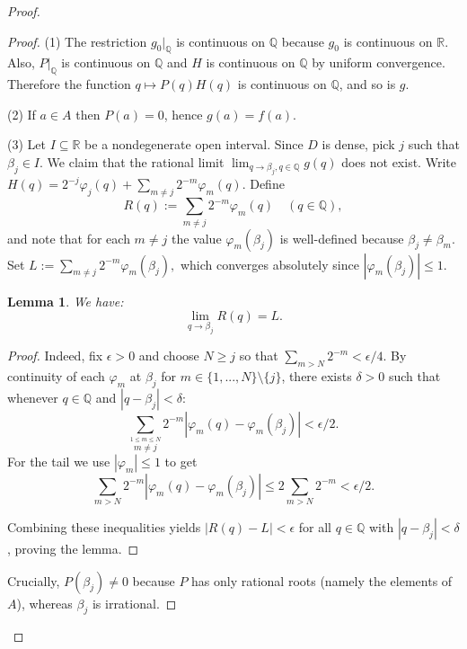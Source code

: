 \documentclass[10pt,a4paper]{amsart}
\newtheorem{lemma}{Lemma}
\begin{document}
\begin{proof}
\begin{proof}
(1) The restriction $g_{0}|_{\mathbb{Q}}$ is continuous on $\mathbb{Q}$ because $g_{0}$ is continuous on $\mathbb{R}$. Also, $P|_{\mathbb{Q}}$ is continuous on $\mathbb{Q}$ and $H$ is continuous on $\mathbb{Q}$ by uniform convergence. Therefore the function $q\mapsto P(q)H(q)$ is continuous on $\mathbb{Q}$, and so is $g$.

(2) If $a\in A$ then $P(a)=0$, hence $g(a)=f(a).$

(3) Let $I\subseteq\mathbb{R}$ be a nondegenerate open interval. Since $D$ is dense, pick $j$ such that $\beta_{j}\in I$. We claim that the rational limit $\lim_{q\rightarrow\beta_{j},q\in\mathbb{Q}}g(q)$ does not exist. Write $H(q)=2^{-j}\varphi_{j}(q)+\sum_{m\ne j}2^{-m}\varphi_{m}(q).$
Define
\begin{equation} 
R(q):=\sum_{m\ne j}2^{-m}\varphi_{m}(q) \quad (q\in\mathbb{Q}), \end{equation}
and note that for each $m\ne j$ the value $\varphi_{m}(\beta_{j})$ is well-defined because $\beta_{j}\ne\beta_{m}$. Set $L:=\sum_{m\ne j}2^{-m}\varphi_{m}(\beta_{j}),$ 
which converges absolutely since $|\varphi_{m}(\beta_{j})|\le1$.
\begin{lemma}  We have:
\begin{equation} 
\lim_{q\rightarrow\beta_{j}}R(q)=L.
\end{equation} 
\end{lemma} 
\begin{proof} 
Indeed, fix $\epsilon>0$ and choose $N\geq j$ so that $\sum_{m>N}2^{-m}<\epsilon/4$. By continuity of each $\varphi_{m}$ at $\beta_{j}$ for $m\in\{1,...,N\}\setminus\{j\}$, there exists $\delta>0$ such that whenever $q\in\mathbb{Q}$ and $|q-\beta_{j}|<\delta$:
\begin{equation} 
\sum_{\stackrel{1\le m\le N}{m\neq j}}2^{-m}|\varphi_{m}(q)-\varphi_{m}(\beta_{j})|<\epsilon/2. 
\end{equation} 
For the tail we use $|\varphi_{m}|\le1$ to get
\begin{equation} 
\sum_{m>N}2^{-m}|\varphi_{m}(q)-\varphi_{m}(\beta_{j})|\le2\sum_{m>N}2^{-m}<\epsilon/2.
\end{equation}  

Combining these inequalities yields $|R(q)-L|<\epsilon$ for all $q\in\mathbb{Q}$ with $|q-\beta_{j}|<\delta$, proving the lemma.
\end{proof} 

Crucially, $P(\beta_{j})\ne0$ because $P$ has only rational roots (namely the elements of $A$), whereas $\beta_{j}$ is irrational.


\end{proof}
\end{proof}
\end{document}
